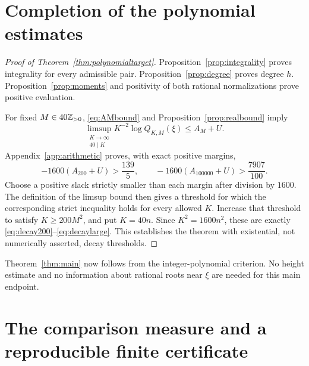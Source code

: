 \section{Completion of the polynomial estimates}
\label{sec:finish}
\begin{proof}[Proof of Theorem~\ref{thm:polynomialtarget}]
Proposition~\ref{prop:integrality} proves integrality for every
admissible pair. Proposition~\ref{prop:degree} proves degree $h$.
Proposition~\ref{prop:moments} and positivity of both rational
normalizations prove positive evaluation.

For fixed $M\in40\mathbb Z_{>0}$, \eqref{eq:AMbound} and
Proposition~\ref{prop:realbound} imply
\begin{equation}\label{eq:finalasymptotic}
 \limsup_{\substack{K\to\infty\\40\mid K}}
        K^{-2}\log Q_{K,M}(\xi)\le A_M+U.
\end{equation}
Appendix~\ref{app:arithmetic} proves, with exact positive margins,
\[
 -1600(A_{200}+U)>\frac{139}{5},\qquad
 -1600(A_{100000}+U)>\frac{7907}{100}.
\]
Choose a positive slack strictly smaller than each margin after division
by $1600$. The definition of the limsup bound then gives a threshold
for which the corresponding strict inequality holds for every allowed
$K$. Increase that threshold to satisfy $K\ge200M^2$, and put $K=40n$.
Since $K^2=1600n^2$, these are exactly
\eqref{eq:decay200}--\eqref{eq:decaylarge}. This establishes the theorem
with existential, not numerically asserted, decay thresholds.
\end{proof}
Theorem~\ref{thm:main} now follows from the integer-polynomial criterion.
No height estimate and no information about rational roots near $\xi$
are needed for this main endpoint.

\appendix
\section{The comparison measure and a reproducible finite certificate}
\label{app:measure}
